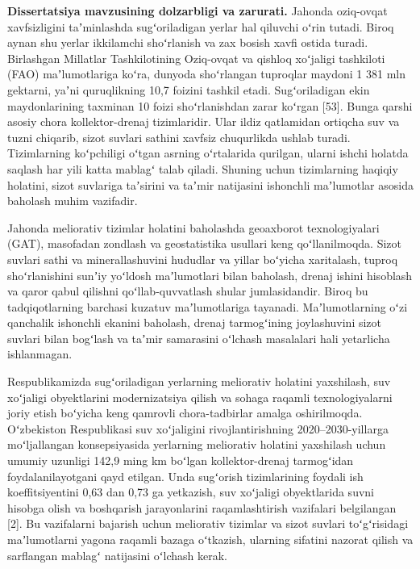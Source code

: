 
\textbf{Dissertatsiya mavzusining dolzarbligi va zarurati.} Jahonda
oziq-ovqat xavfsizligini taʼminlashda sugʻoriladigan yerlar hal qiluvchi
oʻrin tutadi. Biroq aynan shu yerlar ikkilamchi shoʻrlanish va zax
bosish xavfi ostida turadi. Birlashgan Millatlar Tashkilotining
Oziq-ovqat va qishloq xoʻjaligi tashkiloti (FAO) maʼlumotlariga koʻra,
dunyoda shoʻrlangan tuproqlar maydoni 1 381 mln gektarni, yaʼni
quruqlikning 10,7 foizini tashkil etadi. Sugʻoriladigan ekin
maydonlarining taxminan 10 foizi shoʻrlanishdan zarar koʻrgan {[}53{]}.
Bunga qarshi asosiy chora kollektor-drenaj tizimlaridir. Ular ildiz
qatlamidan ortiqcha suv va tuzni chiqarib, sizot suvlari sathini xavfsiz
chuqurlikda ushlab turadi. Tizimlarning koʻpchiligi oʻtgan asrning
oʻrtalarida qurilgan, ularni ishchi holatda saqlash har yili katta
mablagʻ talab qiladi. Shuning uchun tizimlarning haqiqiy holatini, sizot
suvlariga taʼsirini va taʼmir natijasini ishonchli maʼlumotlar asosida
baholash muhim vazifadir.

Jahonda meliorativ tizimlar holatini baholashda geoaxborot
texnologiyalari (GAT), masofadan zondlash va geostatistika usullari keng
qoʻllanilmoqda. Sizot suvlari sathi va minerallashuvini hududlar va
yillar boʻyicha xaritalash, tuproq shoʻrlanishini sunʼiy yoʻldosh
maʼlumotlari bilan baholash, drenaj ishini hisoblash va qaror qabul
qilishni qoʻllab-quvvatlash shular jumlasidandir. Biroq bu
tadqiqotlarning barchasi kuzatuv maʼlumotlariga tayanadi.
Maʼlumotlarning oʻzi qanchalik ishonchli ekanini baholash, drenaj
tarmogʻining joylashuvini sizot suvlari bilan bogʻlash va taʼmir
samarasini oʻlchash masalalari hali yetarlicha ishlanmagan.

Respublikamizda sugʻoriladigan yerlarning meliorativ holatini
yaxshilash, suv xoʻjaligi obyektlarini modernizatsiya qilish va sohaga
raqamli texnologiyalarni joriy etish boʻyicha keng qamrovli
chora-tadbirlar amalga oshirilmoqda. Oʻzbekiston Respublikasi suv
xoʻjaligini rivojlantirishning 2020--2030-yillarga moʻljallangan
konsepsiyasida yerlarning meliorativ holatini yaxshilash uchun umumiy
uzunligi 142,9 ming km boʻlgan kollektor-drenaj tarmogʻidan
foydalanilayotgani qayd etilgan. Unda sugʻorish tizimlarining foydali
ish koeffitsiyentini 0,63 dan 0,73 ga yetkazish, suv xoʻjaligi
obyektlarida suvni hisobga olish va boshqarish jarayonlarini
raqamlashtirish vazifalari belgilangan {[}2{]}. Bu vazifalarni bajarish
uchun meliorativ tizimlar va sizot suvlari toʻgʻrisidagi maʼlumotlarni
yagona raqamli bazaga oʻtkazish, ularning sifatini nazorat qilish va
sarflangan mablagʻ natijasini oʻlchash kerak.

